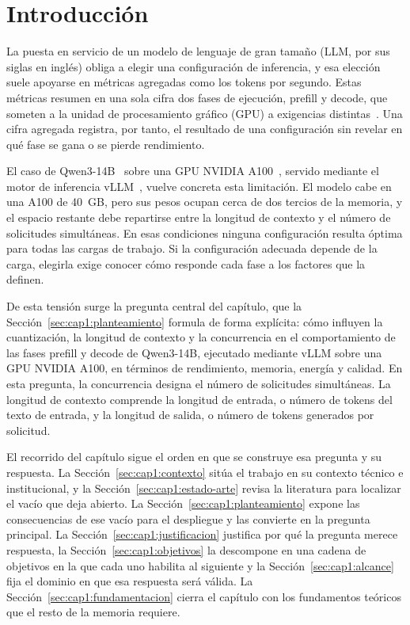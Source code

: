 \chapter{Introducción}
\label{chap:introduccion}

La puesta en servicio de un modelo de lenguaje de gran tamaño (LLM, por sus siglas en inglés) obliga a elegir una configuración de inferencia, y esa elección suele apoyarse en métricas agregadas como los tokens por segundo. Estas métricas resumen en una sola cifra dos fases de ejecución, prefill y decode, que someten a la unidad de procesamiento gráfico (GPU) a exigencias distintas~\cite{zhong2024distserve}. Una cifra agregada registra, por tanto, el resultado de una configuración sin revelar en qué fase se gana o se pierde rendimiento.

El caso de Qwen3-14B~\cite{qwen2025qwen3} sobre una GPU NVIDIA A100~\cite{nvidia2021a100}, servido mediante el motor de inferencia vLLM~\cite{kwon2023pagedattention}, vuelve concreta esta limitación. El modelo cabe en una A100 de 40~GB, pero sus pesos ocupan cerca de dos tercios de la memoria, y el espacio restante debe repartirse entre la longitud de contexto y el número de solicitudes simultáneas. En esas condiciones ninguna configuración resulta óptima para todas las cargas de trabajo. Si la configuración adecuada depende de la carga, elegirla exige conocer cómo responde cada fase a los factores que la definen.

De esta tensión surge la pregunta central del capítulo, que la Sección~\ref{sec:cap1:planteamiento} formula de forma explícita: cómo influyen la cuantización, la longitud de contexto y la concurrencia en el comportamiento de las fases prefill y decode de Qwen3-14B, ejecutado mediante vLLM sobre una GPU NVIDIA A100, en términos de rendimiento, memoria, energía y calidad. En esta pregunta, la concurrencia designa el número de solicitudes simultáneas. La longitud de contexto comprende la longitud de entrada, o número de tokens del texto de entrada, y la longitud de salida, o número de tokens generados por solicitud.

El recorrido del capítulo sigue el orden en que se construye esa pregunta y su respuesta. La Sección~\ref{sec:cap1:contexto} sitúa el trabajo en su contexto técnico e institucional, y la Sección~\ref{sec:cap1:estado-arte} revisa la literatura para localizar el vacío que deja abierto. La Sección~\ref{sec:cap1:planteamiento} expone las consecuencias de ese vacío para el despliegue y las convierte en la pregunta principal. La Sección~\ref{sec:cap1:justificacion} justifica por qué la pregunta merece respuesta, la Sección~\ref{sec:cap1:objetivos} la descompone en una cadena de objetivos en la que cada uno habilita al siguiente y la Sección~\ref{sec:cap1:alcance} fija el dominio en que esa respuesta será válida. La Sección~\ref{sec:cap1:fundamentacion} cierra el capítulo con los fundamentos teóricos que el resto de la memoria requiere.

